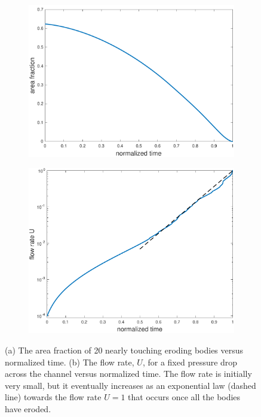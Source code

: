 \documentclass{jfm}
\begin{document}
\begin{figure}
\begin{subfigure}[b]{0.5\textwidth}
\includegraphics*[height = 0.7\linewidth]{./figs/porosity20dense}
\caption{}
\end{subfigure}
\begin{subfigure}[b]{0.5\textwidth}
\includegraphics*[height = 0.7\linewidth]{./figs/flow_rate20densen}
\caption{}
\end{subfigure}
\caption{\label{fig:Eroding20flowrate}(a) The area fraction of 20
nearly touching eroding bodies versus normalized time. (b) The flow
rate, $U$, for a fixed pressure drop across the channel versus
normalized time.  The flow rate is initially very small, but it
eventually increases as an exponential law  (dashed line) towards the
flow rate $U=1$ that occurs once all the bodies have eroded.}
\end{figure}
\end{document}
